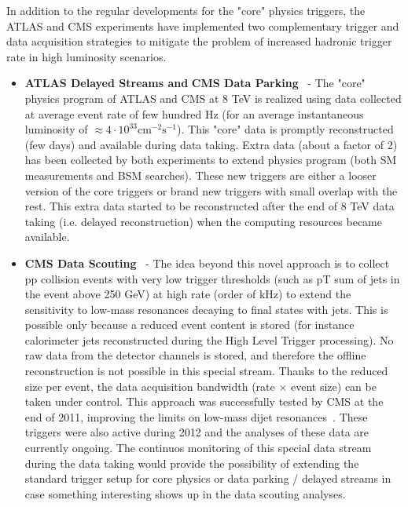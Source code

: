 \documentclass{PoS}
\begin{document}
In addition to the regular developments for the "core" physics triggers, the ATLAS and CMS experiments have implemented two complementary trigger and data acquisition strategies to mitigate the problem of increased hadronic trigger rate in high luminosity scenarios.
\begin{itemize}
\item {\bf ATLAS Delayed Streams and} {\bf CMS Data Parking}~\cite{CMS-DP-2012-022} - The "core" physics program of ATLAS and CMS  at 8 TeV is realized using data collected at average event rate of few hundred Hz (for an average instantaneous luminosity of  $\approx 4 \cdot 10^{33} \mbox{cm}^{-2}\mbox{s}^{-1}$). This "core" data is promptly reconstructed (few days) and available during data taking.  Extra data (about a factor of 2) has been collected by both experiments to extend physics program (both SM measurements and BSM searches). 
These new triggers are either a looser version of the core triggers or brand new triggers with small overlap with the rest. This extra data started to be reconstructed after the end of 8 TeV data taking (i.e. delayed reconstruction) when the computing resources became available.
\item {\bf CMS Data Scouting}~\cite{CMS-DP-2012-022} - The idea beyond this novel approach is to collect pp collision events with very low trigger thresholds (such as pT sum of jets in the event above 250 GeV) at high rate (order of kHz) to extend the sensitivity to low-mass resonances decaying to final states with jets. This is possible only because a reduced event content is stored (for instance calorimeter jets reconstructed during the High Level Trigger processing). No raw data from the detector channels is stored, and therefore the offline reconstruction is not possible in this special stream. Thanks to the reduced size per event, the data acquisition bandwidth (rate $\times$ event size) can be taken
under control. This approach was successfully tested by CMS at the end of 2011, improving the limits on low-mass dijet resonances~\cite{CMS-PAS-EXO-11-094}. These triggers were also active during 2012 and the analyses of these data are currently ongoing. The continuos monitoring of this special data stream during the data taking would provide the possibility of extending the standard trigger setup for core physics or data parking / delayed streams in case something interesting shows up in the data scouting analyses. 
\end{itemize}

\end{document}
